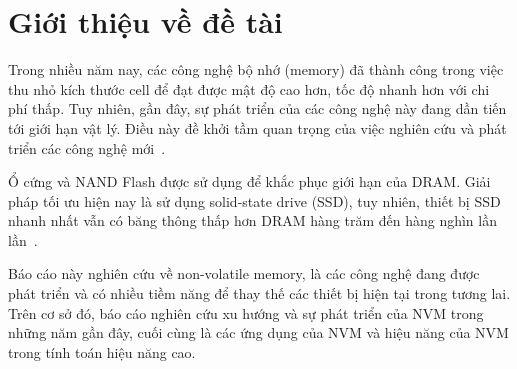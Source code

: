 \section{Giới thiệu về đề tài}
\label{sec:introduction}

Trong nhiều năm nay, các công nghệ bộ nhớ (memory) đã thành công trong việc thu
nhỏ kích thước cell để đạt được mật độ cao hơn, tốc độ nhanh hơn với chi phí
thấp. Tuy nhiên, gần đây, sự phát triển của các công nghệ này đang dần tiến tới
giới hạn vật lý. Điều này đề khởi tầm quan trọng của việc nghiên cứu và phát
triển các công nghệ mới~\cite{apalkovSpintransferTorqueMagnetic2013}.


Ổ cứng và NAND Flash được sử dụng để khắc phục giới hạn của DRAM. Giải pháp tối
ưu hiện nay là sử dụng solid-state drive (SSD), tuy nhiên, thiết bị SSD nhanh
nhất vẫn có băng thông thấp hơn DRAM hàng trăm đến hàng nghìn lần
lần~\cite{mironovPerformanceEvaluationIntel2019}.

Báo cáo này nghiên cứu về non-volatile memory, là các công nghệ đang được phát
triển và có nhiều tiềm năng để thay thế các thiết bị hiện tại trong tương lai.
Trên cơ sở đó, báo cáo nghiên cứu xu hướng và sự phát triển của NVM trong những
năm gần đây, cuối cùng là các ứng dụng của NVM và hiệu năng của NVM trong tính
toán hiệu năng cao.
